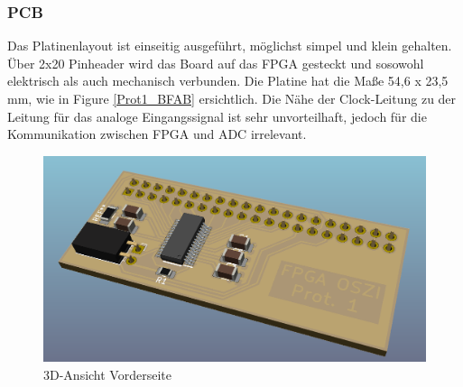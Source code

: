 \subsubsection{PCB}
Das Platinenlayout ist einseitig ausgeführt, möglichst simpel und klein gehalten. Über 2x20 Pinheader wird das Board auf das FPGA gesteckt und sosowohl elektrisch als auch mechanisch verbunden. Die Platine hat die Maße 54,6 x 23,5 mm, wie in Figure \ref{Prot1_BFAB} ersichtlich. Die Nähe der Clock-Leitung zu der Leitung für das analoge Eingangssignal ist sehr unvorteilhaft, jedoch für die Kommunikation zwischen FPGA und ADC irrelevant.
\begin{figure}[H]
\begin{center}
\includegraphics[width = 15cm]{SAUER/Grafiken/Prot1/3DF.png}
\caption{3D-Ansicht Vorderseite}
\end{center}
\end{figure}

